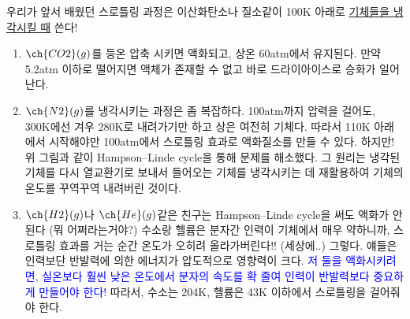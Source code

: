 \documentclass{article}
\begin{document}
\noindent
우리가 앞서 배웠던 스로틀링 과정은 이산화탄소나 질소같이 100K 아래로 \underline{기체들을 냉각시킬 때} 쓴다!
\begin{enumerate}
    \item $\ch{CO2}(g)$를 등온 압축 시키면 액화되고, 상온 60atm에서 유지된다. 만약 5.2atm 이하로 떨어지면 액체가 존재할 수 없고 바로 드라이아이스로 승화가 일어난다.
    \item $\ch{N2}(g)$를 냉각시키는 과정은 좀 복잡하다. 100atm까지 압력을 걸어도, 300K에선 겨우 280K로 내려가기만 하고 상은 여전히 기체다. 따라서 110K 아래에서 시작해야만 100atm에서 스로틀링 효과로 액화질소를 만들 수 있다. 하지만! 위 그림과 같이 Hampson–Linde cycle을 통해 문제를 해소했다. 그 원리는 냉각된 기체를 다시 열교환기로 보내서 들어오는 기체를 냉각시키는 데 재활용하여 기체의 온도를 꾸역꾸역 내려버린 것이다.
    \item $\ch{H2}(g)$나 $\ch{He}(g)$같은 친구는 Hampson–Linde cycle을 써도 액화가 안된다 (뭐 어쩌라는거야?) 수소랑 헬륨은 분자간 인력이 기체에서 매우 약하니까, 스로틀링 효과를 거는 순간 온도가 오히려 올라가버린다!! (세상에..) 그렇다. 얘들은 인력보단 반발력에 의한 에너지가 압도적으로 영향력이 크다. \textcolor{blue}{저 둘을 액화시키려면, 실온보다 훨씬 낮은 온도에서 분자의 속도를 확 줄여 인력이 반발력보다 중요하게 만들어야 한다!} 따라서, 수소는 204K, 헬륨은 43K 이하에서 스로틀링을 걸어줘야 한다.
\end{enumerate}
\end{document}
